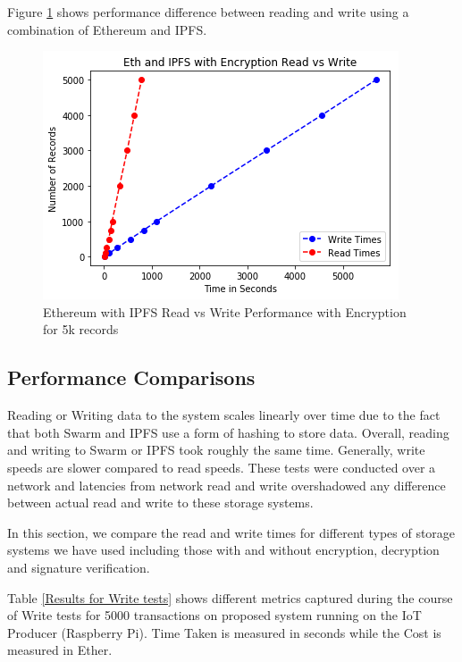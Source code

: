 \documentclass[11pt,openright]{report}
\begin{document}
Figure \ref{fig:graph_eth_ipfs_readvwrite_wencr} shows performance difference between reading and write using a combination of Ethereum and IPFS.

\begin{figure}
    \centering
    \includegraphics[scale=1]{results/graphs/Eth_IPFS_Read_v_Write_Encr.png}
    \caption{Ethereum with IPFS Read vs Write Performance with Encryption for 5k records}
    \label{fig:graph_eth_ipfs_readvwrite_wencr}
\end{figure}


\subsection{Performance Comparisons}
Reading or Writing data to the system scales linearly over time due to the fact that both Swarm and IPFS use a form of hashing to store data. Overall, reading and writing to Swarm or IPFS took roughly the same time. Generally, write speeds are slower compared to read speeds. These tests were conducted over a network and latencies from network read and write overshadowed any difference between actual read and write to these storage systems.

In this section, we compare the read and write times for different types of storage systems we have used including those with and without encryption, decryption and signature verification.

Table \ref{Results for Write tests} shows different metrics captured during the course of Write tests for 5000 transactions on proposed system running on the IoT Producer (Raspberry Pi). Time Taken is measured in seconds while the Cost is measured in Ether. 
\end{document}
